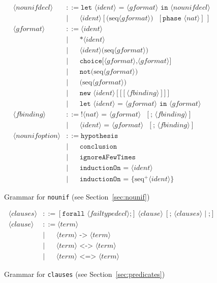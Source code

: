 \documentclass{book}
\newcommand{\nonterm}[1]{\langle\mathit{#1}\rangle}
\newcommand{\seq}[1]{\textrm{seq}\nonterm{#1}}
\newcommand{\neseq}[1]{\textrm{seq}^+\nonterm{#1}}
\begin{document}
\begin{figure}
\begin{align*}
\nonterm{nounifdecl} &::=
	\texttt{let } \nonterm{ident}\texttt{ = }\nonterm{gformat} \texttt{ in }\nonterm{nounifdecl}\\
&\mid\phantom{:=}\nonterm{ident} [\texttt{(} \seq{gformat} \texttt{)}\textrm{ }[\texttt{phase }\nonterm{nat}]\,]\\
%
\nonterm{gformat} &::=
	\nonterm{ident}\\
&\mid\phantom{:=}
	\texttt{*}\nonterm{ident}\\
&\mid\phantom{:=}
	\nonterm{ident}\texttt{(}\seq{gformat}\texttt{)}\\
&\mid\phantom{:=}
	\texttt{choice[} \nonterm{gformat} \texttt{,} \nonterm{gformat} \texttt{]}\\
&\mid\phantom{:=}
	\texttt{not}\texttt{(}\seq{gformat}\texttt{)}\\
&\mid\phantom{:=}
	\texttt{(} \seq{gformat}\texttt{)}\\
&\mid\phantom{:=}
	\texttt{new }\nonterm{ident}[\texttt{[}[\nonterm{fbinding}]\texttt{]}]\\
&\mid\phantom{:=}
	\texttt{let }\nonterm{ident}\texttt{ = }\nonterm{gformat} \texttt{ in }\nonterm{gformat}\\
%
\nonterm{fbinding} &::=
        \texttt{!} \nonterm{nat}\texttt{ = }\nonterm{gformat}\textrm{ }[\texttt{; } \nonterm{fbinding}]\\
&\mid\phantom{:=}
       \nonterm{ident}\texttt{ = }\nonterm{gformat}\textrm{ }[\texttt{; } \nonterm{fbinding}]\\
%
\nonterm{nounifoption} &::=
		\texttt{hypothesis}\\
&\mid\phantom{:=}
		\texttt{conclusion}\\
&\mid\phantom{:=}
		\texttt{ignoreAFewTimes}\\
&\mid\phantom{:=}
		\texttt{inductionOn = }\nonterm{ident}\\
&\mid\phantom{:=}
		\texttt{inductionOn = \{}\neseq{ident}\texttt{\}}
\end{align*}
\caption[Grammar for \texttt{nounif}]{Grammar for \texttt{nounif} (see Section~\ref{sec:nounif})}
\label{fig:grammarNounif}
\end{figure}

\begin{figure}
\begin{align*}
%
\nonterm{clauses} &::=
 [\texttt{forall }\nonterm{failtypedecl}\texttt{;}]\ \nonterm{clause}\ [\texttt{; }\nonterm{clauses} \mid \texttt{;}]\\
\nonterm{clause} &::=
       \nonterm{term}\\
&\mid\phantom{:=}
        \nonterm{term} \texttt{ -> } \nonterm{term}\\
&\mid\phantom{:=}
       \nonterm{term} \texttt{ <-> } \nonterm{term}\\
&\mid\phantom{:=}
       \nonterm{term} \texttt{ <=> } \nonterm{term}
\end{align*}
\caption[Grammar for \texttt{clauses}]{Grammar for \texttt{clauses} (see Section~\ref{sec:predicates})}
\label{fig:grammarClauses}
\end{figure}
\end{document}
